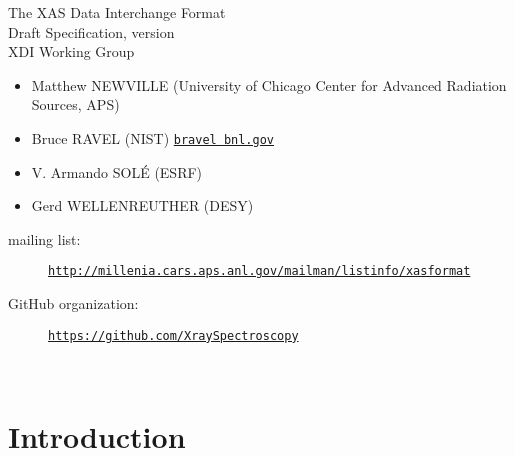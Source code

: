\documentclass{article}
\begin{document}
\begin{center}
  \huge
  The XAS Data Interchange Format\\
  Draft Specification, version \xdiversion\\[3ex]
  \Large
  XDI Working Group\\[2ex]
  \normalsize
  \begin{itemize}
  \item Matthew NEWVILLE (University of Chicago Center for Advanced Radiation Sources, APS)
  \item Bruce RAVEL (NIST) \href{mailto:bravel@bnl.gov}{\texttt{bravel bnl.gov}}
  \item V. Armando SOL{\'E} (ESRF)
  \item Gerd WELLENREUTHER (DESY)
  \end{itemize}
  \begin{description}
  \item[mailing list:]
    \href{http://millenia.cars.aps.anl.gov/mailman/listinfo/xasformat}{\texttt{http://millenia.cars.aps.anl.gov/mailman/listinfo/xasformat}}
  \item[GitHub organization:] \href{https://github.com/XraySpectroscopy}{\texttt{https://github.com/XraySpectroscopy}}
  \end{description}
\end{center}

\tableofcontents



\thispagestyle{empty}
\newpage
\linenumbers
\linenumbersep=25pt


~

\section{Introduction}
\label{sec:introduction}
\end{document}
